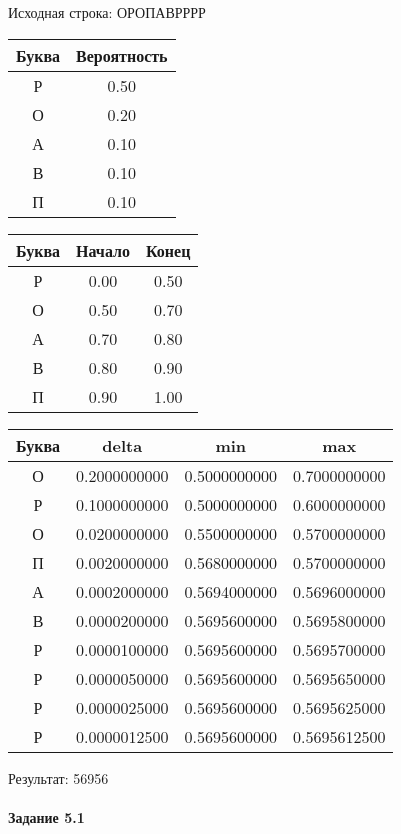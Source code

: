 \documentclass[a4paper, 12pt]{article}
\begin{document}
Исходная строка: ОРОПАВРРРР\
\begin{center}
 \begin{tabular}{ |c|c| } 
  \hline
     Буква & Вероятность \\ \hline
Р & 0.50\\\hline
О & 0.20\\\hline
А & 0.10\\\hline
В & 0.10\\\hline
П & 0.10
\\ \hline \end{tabular}
\end{center}
\begin{center}
 \begin{tabular}{ |c|c|c| } 
  \hline
     Буква & Начало & Конец \\ \hline
Р & 0.00 & 0.50\\\hline
О & 0.50 & 0.70\\\hline
А & 0.70 & 0.80\\\hline
В & 0.80 & 0.90\\\hline
П & 0.90 & 1.00
\\ \hline \end{tabular}
\end{center}
\begin{center}
 \begin{tabular}{ |c|c|c|c| } 
  \hline
     Буква & delta & min & max \\ \hline
О & 0.2000000000 & 0.5000000000 & 0.7000000000\\\hline
Р & 0.1000000000 & 0.5000000000 & 0.6000000000\\\hline
О & 0.0200000000 & 0.5500000000 & 0.5700000000\\\hline
П & 0.0020000000 & 0.5680000000 & 0.5700000000\\\hline
А & 0.0002000000 & 0.5694000000 & 0.5696000000\\\hline
В & 0.0000200000 & 0.5695600000 & 0.5695800000\\\hline
Р & 0.0000100000 & 0.5695600000 & 0.5695700000\\\hline
Р & 0.0000050000 & 0.5695600000 & 0.5695650000\\\hline
Р & 0.0000025000 & 0.5695600000 & 0.5695625000\\\hline
Р & 0.0000012500 & 0.5695600000 & 0.5695612500
\\ \hline \end{tabular}
\end{center}
Результат: 56956
\pagebreak
\paragraph{Задание 5.1}
\end{document}
